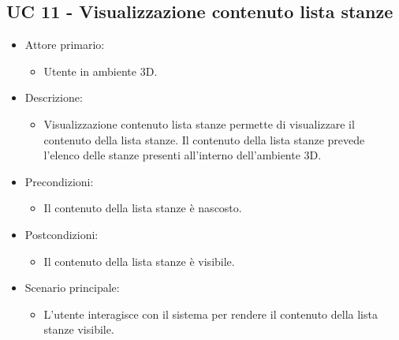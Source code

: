 \subsection{UC 11 - Visualizzazione contenuto lista stanze}
\begin{itemize}

	\item Attore primario: 
	\begin{itemize}
		\item Utente in ambiente 3D.
	\end{itemize}
	\item Descrizione:
	\begin{itemize}
		\item Visualizzazione contenuto lista stanze permette di visualizzare il contenuto della lista stanze.
\newline Il contenuto della lista stanze prevede l'elenco delle stanze presenti all'interno dell'ambiente 3D.
	\end{itemize}
	
	\item Precondizioni:
	\begin{itemize}
		\item Il contenuto della lista stanze è nascosto.
	\end{itemize}
	
	\item Postcondizioni:
	\begin{itemize}
		\item Il contenuto della lista stanze è visibile.
	\end{itemize}
	
	\item Scenario principale:
	\begin{itemize}
		\item L'utente interagisce con il sistema per rendere il contenuto della lista stanze visibile.
	\end{itemize}
	
\end{itemize}

\pagebreak

